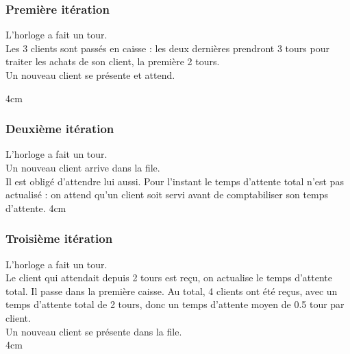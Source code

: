 \documentclass[a4paper,12pt,french]{book}
\begin{document}
\subsubsection*{Première itération}
\double
{
L'horloge a fait un tour.\\
Les 3 clients sont passés en caisse : les deux dernières prendront 3 tours pour traiter les achats de son client, la première 2 tours.\\
Un nouveau client se présente et attend.

}
{
}{4cm}


\subsubsection*{Deuxième itération}
\double 
{
L'horloge a fait un tour.\\
Un nouveau client arrive dans la file.\\
Il est obligé d'attendre lui aussi.
Pour l'instant le temps d'attente total n'est pas actualisé : on attend qu'un client soit servi avant de comptabiliser son temps d'attente.
}
{
}{4cm}

\subsubsection*{Troisième itération}
\double
{
L'horloge a fait un tour.\\
Le client qui attendait depuis 2 tours est reçu, on actualise le temps d'attente total.
Il passe dans la première caisse.
Au total, 4 clients ont été reçus, avec un temps d'attente total de 2 tours, donc un temps d'attente moyen de 0.5 tour par client.\\
Un nouveau client se présente dans la file.\\
}
{
}{4cm}
\end{document}
